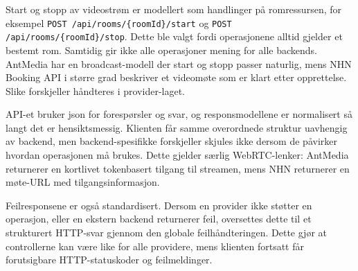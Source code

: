 Start og stopp av videostrøm er modellert som handlinger på romressursen, for
eksempel \texttt{POST /api/rooms/\{roomId\}/start} og
\texttt{POST /api/rooms/\{roomId\}/stop}. Dette ble valgt fordi operasjonene
alltid gjelder et bestemt rom. Samtidig gir ikke alle operasjoner mening for alle
backends. AntMedia har en broadcast-modell der start og stopp passer naturlig,
mens NHN Booking API i større grad beskriver et videomøte som er klart etter
opprettelse. Slike forskjeller håndteres i provider-laget.

API-et bruker \gls{json} for forespørsler og svar, og responsmodellene er normalisert
så langt det er hensiktsmessig. Klienten får samme overordnede struktur
uavhengig av backend, men backend-spesifikke forskjeller skjules ikke dersom de
påvirker hvordan operasjonen må brukes. Dette gjelder særlig WebRTC-lenker:
AntMedia returnerer en kortlivet tokenbasert tilgang til streamen, mens NHN
returnerer en møte-URL med tilgangsinformasjon.

Feilresponsene er også standardisert. Dersom en provider ikke støtter en
operasjon, eller en ekstern backend returnerer feil, oversettes dette til et
strukturert HTTP-svar gjennom den globale feilhåndteringen. Dette gjør at
controllerne kan være like for alle providere, mens klienten fortsatt får
forutsigbare HTTP-statuskoder og feilmeldinger.